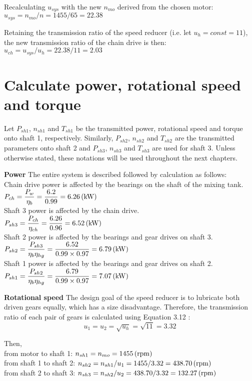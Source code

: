 Recalculating $ u_{sys} $ with the new $ n_{mo} $ derived from the chosen motor:\\
$ u_{sys} = {n_{mo}}/{n} = {1455}/{65} = 22.38 $

Retaining the transmission ratio of the speed reducer (i.e. let $ u_{h} = const = 11 $), the new transmission ratio of the chain drive is then:\\
$ u_{ch} = {u_{sys}}/{u_{h}} = {22.38}/{11} = 2.03 $

\section{Calculate power, rotational speed and torque}
Let $ P_{sh1} $, $ n_{sh1} $ and $ T_{sh1} $ be the transmitted power, rotational speed and torque onto shaft 1, respectively. Similarly, $ P_{sh2} $, $ n_{sh2} $ and $ T_{sh2} $ are the transmitted parameters onto shaft 2 and $ P_{sh3} $, $ n_{sh3} $ and $ T_{sh3} $ are used for shaft 3. Unless otherwise stated, these notations will be used throughout the next chapters.

\textbf{Power} The entire system is described followed by calculation as follows:\\
Chain drive power is affected by the bearings on the shaft of the mixing tank.\\
$ P_{ch} = \dfrac{P_w}{\eta_b} = \dfrac{6.2}{0.99} = 6.26 \, (\mathrm{kW})$\\
Shaft 3 power is affected by the chain drive.\\
$ P_{sh3} = \dfrac{P_{ch}}{\eta_{ch}} = \dfrac{6.26}{0.96} = 6.52 \, (\mathrm{kW})$\\
Shaft 2 power is affected by the bearings and gear drives on shaft 3.\\
$ P_{sh2} = \dfrac{P_{sh3}}{\eta_b\eta_{hg}} = \dfrac{6.52}{0.99 \times 0.97} = 6.79 \, (\mathrm{kW})$\\
Shaft 1 power is affected by the bearings and gear drives on shaft 2.\\
$ P_{sh1} = \dfrac{P_{sh2}}{\eta_b\eta_{hg}} = \dfrac{6.79}{0.99 \times 0.97} = 7.07 \, (\mathrm{kW})$

\textbf{Rotational speed} The design goal of the speed reducer is to lubricate both driven gears equally, which has a size disadvantage. Therefore, the transmission ratio of each pair of gears is calculated using Equation 3.12 \cite{tk1}:
\[u_1=u_2=\sqrt{u_h}=\sqrt{11}=3.32\]

Then,\\
from motor to shaft 1: $ n_{sh1} = n_{mo} = 1455 \, (\mathrm{rpm})$ \\
from shaft 1 to shaft 2: $ n_{sh2} = {n_{sh1}}/{u_{1}} = 1455/3.32 = 438.70 \, (\mathrm{rpm})$\\
from shaft 2 to shaft 3: $ n_{sh3} = {n_{sh2}}/{u_{2}} = 438.70/3.32 = 132.27 \, (\mathrm{rpm})$

